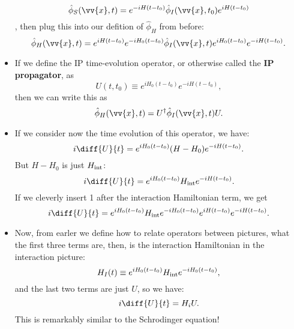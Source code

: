 \begin{itemize}
        \begin{equation*}
            \hat{\phi}_S(\vv{x},t) = e^{-iH(t-t_0)} \hat{\phi}_I(\vv{x},t_0) e^{iH(t-t_0)}
        \end{equation*},
        then plug this into our defition of $\hat{\phi}_H$ from before:
        \begin{equation}
            \hat{\phi}_H(\vv{x},t) = e^{iH(t-t_0)}e^{-iH_0(t-t_0)} \hat{\phi}_I(\vv{x},t)e^{iH_0(t-t_0)}e^{-iH(t-t_0)}.
        \end{equation}
    \item If we define the IP time-evolution operator, or otherwise called the \textbf{IP propagator}, as
        \begin{equation}
            U(t,t_0) \equiv e^{iH_0(t-t_0)}e^{-iH(t-t_0)},
        \end{equation}
        then we can write this as
        \begin{equation}
            \hat{\phi}_H(\vv{x},t) = U^{\dagger}\hat{\phi}_I(\vv{x},t) U.
        \end{equation}
    \item If we consider now the time evolution of this operator, we have:
        \begin{equation*}
            i \diff{U}{t} = e^{iH_0(t-t_0)}(H-H_0)e^{-iH(t-t_0)}.
        \end{equation*}
        But $H-H_0$ is just $H_{\mathrm{int}}$:
        \begin{equation*}
            i \diff{U}{t} = e^{iH_0(t-t_0)} \hint e^{-iH(t-t_0)}.
        \end{equation*}
        If we cleverly insert 1 after the interaction Hamiltonian term, we get
        \begin{equation*}
            i \diff{U}{t} = e^{iH_0(t-t_0)} \hint e^{-iH_0(t-t_0)}e^{iH(t-t_0)} e^{-iH(t-t_0)}.
        \end{equation*}
    \item Now, from earler we define how to relate operators between pictures, what the first three terms are, then, is the interaction Hamiltonian in the interaction picture:
        \begin{equation*}
            H_I(t) \equiv e^{iH_0(t-t_0)} H_{\mathrm{int}} e^{-iH_0(t-t_0)},
        \end{equation*}
        and the last two terms are just $U$, so we have:
        \begin{equation}
            i\diff{U}{t} = H_i U.
        \end{equation}
        This is remarkably similar to the Schrodinger equation!
\end{itemize}

